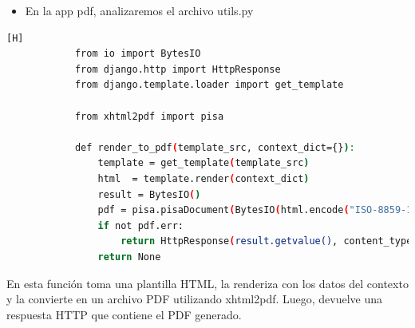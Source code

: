 \documentclass{article}
\begin{document}
        \begin{itemize}
            \item En la app pdf, analizaremos el archivo utils.py
        \end{itemize}
        \begin{lstlisting}[language=bash,caption={Archivo pdf/utils.py}][H]
            from io import BytesIO
            from django.http import HttpResponse
            from django.template.loader import get_template
            
            from xhtml2pdf import pisa
            
            def render_to_pdf(template_src, context_dict={}):
                template = get_template(template_src)
                html  = template.render(context_dict)
                result = BytesIO()
                pdf = pisa.pisaDocument(BytesIO(html.encode("ISO-8859-1")), result)
                if not pdf.err:
                    return HttpResponse(result.getvalue(), content_type='application/pdf')
                return None
	\end{lstlisting}
        En esta función toma una plantilla HTML, la renderiza con los datos del contexto y la convierte en un archivo PDF utilizando xhtml2pdf. Luego, devuelve una respuesta HTTP que contiene el PDF generado. \newline
\end{document}
